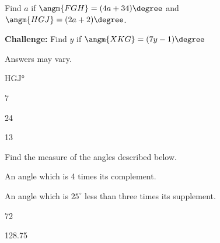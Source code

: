 \begin{exercises}
\begin{ex}
\begin{exparts}
		\medskip
				
		\item Find $a$ if $\angm{FGH} = (4a+34)\degree$ 
		and $\angm{HGJ} = (2a+2)\degree$.
		
		\medskip
		
		\item \textbf{Challenge:  }Find $y$ if $\angm{XKG} = (7y -1)\degree$
		
		\medskip

	\end{exparts}
	\begin{sol}
	\hspace*{\fill}
	\begin{exparts}
	\item Answers may vary.\\
	\item \ang {HGJ}
	\item 7
	\item 24
	\item 13
	\end{exparts}
	\end{sol}
	\end{ex}	
	
	
	\begin{ex} Find the measure of the angles described below.
	\begin{exparts}
		\item An angle which is 4 times its complement.
		\vspace{2cm}
		\item An angle which is $25^\circ$ less than three times its supplement.
		\vspace{2cm}
	\end{exparts}
	
	\begin{sol}
	\begin{exparts}
	\item 72\degree
	\item 128.75\degree
	\end{exparts}
	\end{sol}
	\end{ex}
	

\end{exercises}
